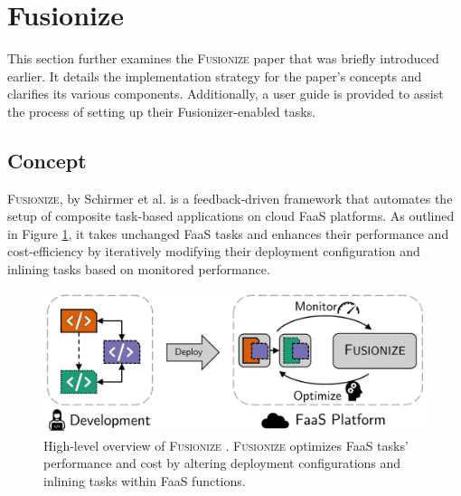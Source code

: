 
\section{Fusionize}\label{sec:fusionize}


This section further examines the \textsc{Fusionize} paper that was briefly
introduced earlier. It details the implementation strategy for the paper's
concepts and clarifies its various components. Additionally, a user guide is
provided to assist the process of setting up their Fusionizer-enabled tasks.

\subsection{Concept}

\textsc{Fusionize}, by Schirmer et al. \cite{schirmer2023fusionize} is a
feedback-driven framework that automates the setup of composite task-based
applications on cloud FaaS platforms. As outlined in Figure
\ref{fig:fusionize_highlvl}, it takes unchanged FaaS tasks and enhances their
performance and cost-efficiency by iteratively modifying their deployment
configuration and inlining tasks based on monitored performance.

\begin{figure}
    \centering
    \includegraphics[width=\linewidth]{../figures/fusionize_highlvl}
    \caption{
        High-level overview of \textsc{Fusionize} \cite{schirmer2023fusionize}.
        \textsc{Fusionize} optimizes FaaS tasks' performance and cost by
        altering deployment configurations and inlining tasks within FaaS
        functions.
    }
    \label{fig:fusionize_highlvl}
\end{figure}

